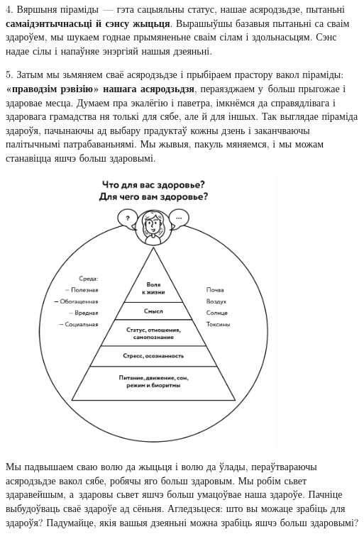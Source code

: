 4. Вяршыня піраміды~--- гэта сацыяльны статус, нашае асяродзьдзе, пытаньні \textbf{самаідэнтычнасьці й сэнсу жыцьця}. Вырашыўшы базавыя пытаньні са сваім здароўем, мы шукаем годнае прымяненьне сваім сілам і здольнасьцям. Сэнс надае сілы і напаўняе энэргіяй нашыя дзеяньні.

5. Затым мы зьмяняем сваё асяродзьдзе і прыбіраем прастору вакол піраміды: \textbf{«праводзім рэвізію» нашага асяродзьдзя}, пераязджаем у~больш прыгожае і здаровае месца. Думаем пра экалёгію і паветра, імкнёмся да справядлівага і здаровага грамадства ня толькі для сябе, але й для іншых. Так выглядае піраміда здароўя, пачынаючы ад выбару прадуктаў кожны дзень і заканчваючы палітычнымі патрабаваньнямі. Мы жывыя, пакуль мяняемся, і мы можам станавіцца яшчэ больш здаровымі.

\begin{figure}[htb!]
  \centering
  \includegraphics[width=0.8\textwidth]{willpower/pic2.png}
\end{figure}

Мы падвышаем сваю волю да жыцьця і волю да ўлады, пераўтвараючы асяродзьдзе вакол сябе, робячы яго больш здаровым. Мы робім сьвет здаравейшым, а~здаровы сьвет яшчэ больш умацоўвае наша здароўе. Пачніце выбудоўваць сваё здароўе ад сёньня. Агледзьцеся: што вы можаце зрабіць для здароўя? Падумайце, якія вашыя дзеяньні можна зрабіць яшчэ больш здаровымі?

